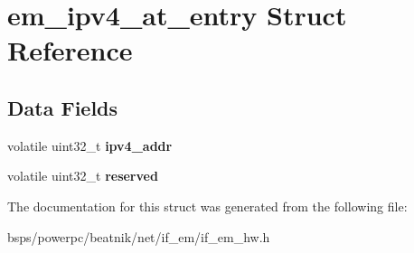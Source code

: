 \hypertarget{structem__ipv4__at__entry}{}\section{em\+\_\+ipv4\+\_\+at\+\_\+entry Struct Reference}
\label{structem__ipv4__at__entry}
\subsection*{Data Fields}
\begin{DoxyCompactItemize}
\item 
\mbox{\label{structem__ipv4__at__entry_ab5e62da261865b3aeedc243d2b335f43}} 
volatile uint32\+\_\+t {\bfseries ipv4\+\_\+addr}
\item 
\mbox{\label{structem__ipv4__at__entry_a747d764d684fe119b30ef433f2a525be}} 
volatile uint32\+\_\+t {\bfseries reserved}
\end{DoxyCompactItemize}


The documentation for this struct was generated from the following file\+:\begin{DoxyCompactItemize}
\item 
bsps/powerpc/beatnik/net/if\+\_\+em/if\+\_\+em\+\_\+hw.\+h\end{DoxyCompactItemize}
